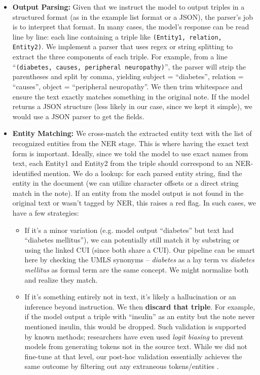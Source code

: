 \begin{itemize}
\item \textbf{Output Parsing:} Given that we instruct the model to output triples in a structured format (as in the example list format or a JSON), the parser's job is to interpret that format. In many cases, the model's response can be read line by line: each line containing a triple like \texttt{(Entity1, relation, Entity2)}. We implement a parser that uses regex or string splitting to extract the three components of each triple. For example, from a line ``\texttt{(diabetes, causes, peripheral neuropathy)}'', the parser will strip the parentheses and split by comma, yielding subject = ``diabetes'', relation = ``causes'', object = ``peripheral neuropathy''. We then trim whitespace and ensure the text exactly matches something in the original note. If the model returns a JSON structure (less likely in our case, since we kept it simple), we would use a JSON parser to get the fields.

\item \textbf{Entity Matching:} We cross-match the extracted entity text with the list of recognized entities from the NER stage. This is where having the exact text form is important. Ideally, since we told the model to use exact names from text, each Entity1 and Entity2 from the triple should correspond to an NER-identified mention. We do a lookup: for each parsed entity string, find the entity in the document (we can utilize character offsets or a direct string match in the note). If an entity from the model output is not found in the original text or wasn't tagged by NER, this raises a red flag. In such cases, we have a few strategies:

  \begin{itemize}
  \item If it's a minor variation (e.g. model output ``diabetes'' but text had ``diabetes mellitus''), we can potentially still match it by substring or using the linked CUI (since both share a CUI). Our pipeline can be smart here by checking the UMLS synonyms – \textit{diabetes} as a lay term vs \textit{diabetes mellitus} as formal term are the same concept. We might normalize both and realize they match.
  \item If it's something entirely not in text, it's likely a hallucination or an inference beyond instruction. We then \textbf{discard that triple}. For example, if the model output a triple with ``insulin'' as an entity but the note never mentioned insulin, this would be dropped. Such validation is supported by known methods; researchers have even used \textit{logit biasing} to prevent models from generating tokens not in the source text. While we did not fine-tune at that level, our post-hoc validation essentially achieves the same outcome by filtering out any extraneous tokens/entities \parencite{Ji2023}.
  \end{itemize}


\end{itemize}
